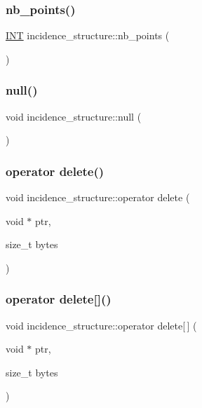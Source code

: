 \subsubsection{\texorpdfstring{nb\+\_\+points()}{nb\_points()}}
{\footnotesize\ttfamily \mbox{\hyperlink{galois_8h_a09fddde158a3a20bd2dcadb609de11dc}{I\+NT}} incidence\+\_\+structure\+::nb\+\_\+points (\begin{DoxyParamCaption}{ }\end{DoxyParamCaption})}

\mbox{\label{classincidence__structure_a83fb7042009486cd766cfc3c410cbc48}} 
\subsubsection{\texorpdfstring{null()}{null()}}
{\footnotesize\ttfamily void incidence\+\_\+structure\+::null (\begin{DoxyParamCaption}{ }\end{DoxyParamCaption})}

\mbox{\label{classincidence__structure_a87bb620c8c4933f1b6a2dbe225fb6411}} 
\subsubsection{\texorpdfstring{operator delete()}{operator delete()}}
{\footnotesize\ttfamily void incidence\+\_\+structure\+::operator delete (\begin{DoxyParamCaption}\item[{void $\ast$}]{ptr,  }\item[{size\+\_\+t}]{bytes }\end{DoxyParamCaption})}

\mbox{\label{classincidence__structure_aa57f02f0ee8610b67b1065c20d968130}} 
\subsubsection{\texorpdfstring{operator delete[]()}{operator delete[]()}}
{\footnotesize\ttfamily void incidence\+\_\+structure\+::operator delete\mbox{[}$\,$\mbox{]} (\begin{DoxyParamCaption}\item[{void $\ast$}]{ptr,  }\item[{size\+\_\+t}]{bytes }\end{DoxyParamCaption})}

